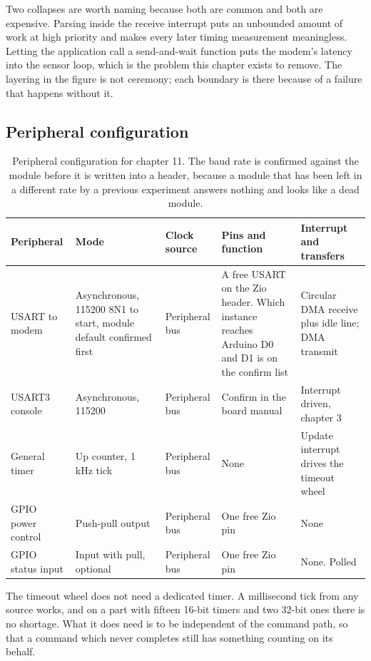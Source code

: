 Two collapses are worth naming because both are common and both are expensive.
Parsing inside the receive interrupt puts an unbounded amount of work at high
priority and makes every later timing measurement meaningless. Letting the
application call a send-and-wait function puts the modem's latency into the
sensor loop, which is the problem this chapter exists to remove. The layering in
the figure is not ceremony; each boundary is there because of a failure that
happens without it.

\subsection*{Peripheral configuration}

\begin{table}[H]\centering\small
\begin{tabular}{p{22mm}p{26mm}p{24mm}p{30mm}p{30mm}}
\toprule
Peripheral & Mode & Clock source & Pins and function & Interrupt and transfers \\
\midrule
USART to modem & Asynchronous, 115200 8N1 to start, module default confirmed first & Peripheral bus & A free USART on the Zio header. Which instance reaches Arduino D0 and D1 is on the confirm list & Circular DMA receive plus idle line; DMA transmit \\
USART3 console & Asynchronous, 115200 & Peripheral bus & Confirm in the board manual & Interrupt driven, chapter 3 \\
General timer & Up counter, 1 kHz tick & Peripheral bus & None & Update interrupt drives the timeout wheel \\
GPIO power control & Push-pull output & Peripheral bus & One free Zio pin & None \\
GPIO status input & Input with pull, optional & Peripheral bus & One free Zio pin & None. Polled \\
\bottomrule
\end{tabular}
\caption{Peripheral configuration for chapter 11. The baud rate is confirmed against the module before it is written into a header, because a module that has been left in a different rate by a previous experiment answers nothing and looks like a dead module.}
\end{table}

The timeout wheel does not need a dedicated timer. A millisecond tick from any
source works, and on a part with fifteen 16-bit timers and two 32-bit ones there
is no shortage. What it does need is to be independent of the command path, so
that a command which never completes still has something counting on its behalf.

